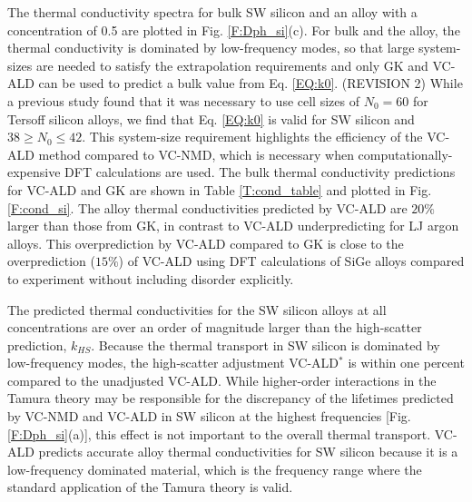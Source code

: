 \documentclass[aps,prb,onecolumn,preprint,footinbib,superscriptaddress,amsmath,amssymb,floatfix]{revtex4}
\begin{document}
The thermal conductivity spectra for bulk SW silicon and an alloy 
with a concentration of 0.5 are plotted in Fig. \ref{F:Dph_si}(c). 
For bulk and the alloy, the thermal conductivity is dominated by 
low-frequency modes, so that large system-sizes are needed to satisfy 
the extrapolation requirements and only GK and VC-ALD can be used to 
predict a bulk value from Eq. \eqref{EQ:k0}. (REVISION 2) While a previous 
study found that it was necessary to use cell sizes of $N_0 = 60$ for Tersoff silicon 
alloys,\cite{he_morphology_2011} we find that  
Eq. \eqref{EQ:k0} is valid for SW silicon and $38 \ge N_0 \le 42$. 
This system-size requirement highlights the efficiency of the 
VC-ALD method compared to VC-NMD, which is necessary when 
computationally-expensive DFT calculations are used.
\cite{esfarjani_method_2008,garg_role_2011,tian_phonon_2012,lindsay_thermal_2012,esfarjani_heat_2011,chaput_phonon-phonon_2011}
The bulk thermal conductivity 
predictions for VC-ALD and GK are shown in Table \ref{T:cond_table} and 
plotted in Fig. \ref{F:cond_si}. The alloy thermal conductivities predicted 
by VC-ALD are $20\%$ larger than those from GK, in contrast to VC-ALD 
underpredicting for LJ argon alloys. This overprediction 
by VC-ALD compared to GK is close to the overprediction ($15\%$) of VC-ALD 
using DFT calculations of SiGe alloys compared to experiment 
without including disorder explicitly.\cite{garg_role_2011} 

The predicted thermal conductivities for the SW silicon alloys at 
all concentrations are over an order of magnitude larger than
the high-scatter prediction, $k_{HS}$. 
Because the thermal transport in SW silicon 
is dominated by low-frequency modes, the high-scatter adjustment  
VC-ALD$^*$ is within one percent compared 
to the unadjusted VC-ALD. 
While higher-order interactions in the Tamura theory 
may be responsible for the 
discrepancy of the lifetimes predicted by VC-NMD and VC-ALD in SW silicon 
at the highest frequencies [Fig. \ref{F:Dph_si}(a)],  
this effect is not important to the overall
thermal transport. VC-ALD predicts accurate alloy thermal 
conductivities for SW silicon because it is a low-frequency 
dominated material, which is the frequency range where the standard 
application of the Tamura theory is valid.\cite{tamura_isotope_1983} 
\end{document}
